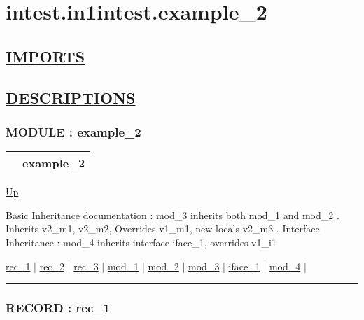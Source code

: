 \chapter*{intest.in1intest.example\_2}
\hypertarget{ecldoc:toc:intest.in1intest.example_2}{}

\section*{\underline{IMPORTS}}

\section*{\underline{DESCRIPTIONS}}
\subsection*{MODULE : example\_2}
\hypertarget{ecldoc:intest.in1intest.example_2}{}

{\renewcommand{\arraystretch}{1.5}
\begin{tabularx}{\textwidth}{|>{\raggedright\arraybackslash}l|X|}
\hline
\hspace{0pt} & example\_2 \\
\hline
\end{tabularx}
}

\hyperlink{ecldoc:toc:intest/in1intest}{Up}

\par
Basic Inheritance documentation : mod\_3 inherits both mod\_1 and mod\_2 . Inherits v2\_m1, v2\_m2, Overrides v1\_m1, new locals v2\_m3 . Interface Inheritance : mod\_4 inherits interface iface\_1, overrides v1\_i1


\hyperlink{ecldoc:intest.in1intest.example_2.rec_1}{rec\_1}  |
\hyperlink{ecldoc:intest.in1intest.example_2.rec_2}{rec\_2}  |
\hyperlink{ecldoc:intest.in1intest.example_2.rec_3}{rec\_3}  |
\hyperlink{ecldoc:intest.in1intest.example_2.mod_1}{mod\_1}  |
\hyperlink{ecldoc:intest.in1intest.example_2.mod_2}{mod\_2}  |
\hyperlink{ecldoc:intest.in1intest.example_2.mod_3}{mod\_3}  |
\hyperlink{ecldoc:intest.in1intest.example_2.iface_1}{iface\_1}  |
\hyperlink{ecldoc:intest.in1intest.example_2.mod_4}{mod\_4}  |

\rule{\textwidth}{0.4pt}

\subsection*{RECORD : rec\_1}
\hypertarget{ecldoc:intest.in1intest.example_2.rec_1}{}


